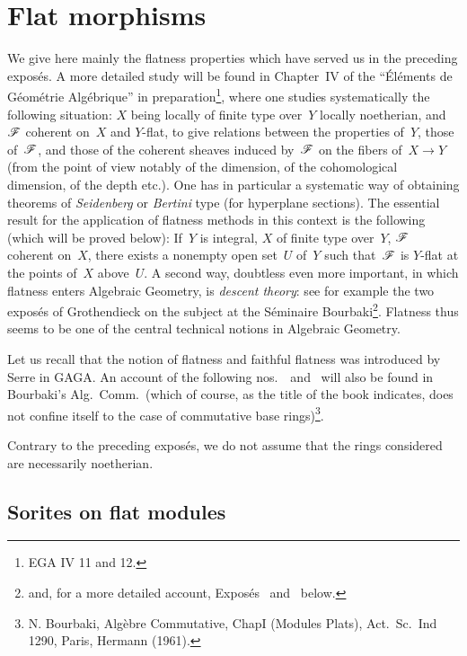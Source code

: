 \chapter{Flat morphisms}\label{IV}
We give here mainly the flatness properties which have served us in
the preceding expos\'es. A more detailed study will be found in
Chapter~IV of the ``\'El\'ements de G\'eom\'etrie Alg\'ebrique'' in
preparation\footnote{\Cf EGA IV 11 and 12.}, where one studies
systematically the following situation: $X$ being locally of finite
type over~$Y$ locally noetherian, and~$\cal{F}$ coherent on~$X$ and
$Y$-flat, to give relations between the properties of~$Y$, those
of~$\cal{F}$, and those of the coherent sheaves induced by~$\cal{F}$
on the fibers of~$X\to Y$ (from the point of view notably of the
dimension, of the cohomological dimension, of the depth etc.). One
has in particular a systematic way of obtaining theorems of
\emph{Seidenberg} or \emph{Bertini} type (for hyperplane sections).
The essential result for the application of flatness methods in this
context is the following (which will be proved below): If~$Y$ is
integral, $X$ of finite type over~$Y$, $\cal{F}$ coherent on~$X$,
there exists a nonempty open set~$U$ of~$Y$ such that~$\cal{F}$ is
$Y$-flat at the points of~$X$ above~$U$. A second way, doubtless even
more important, in which flatness enters Algebraic Geometry, is
\emph{descent theory}: see for example the two expos\'es of
Grothendieck on the subject at the S\'eminaire
Bourbaki\footnote{and, for a more detailed account,
Expos\'es~ and~ below.}. Flatness thus seems to be
one of the central technical notions in Algebraic Geometry.

Let us recall that the notion of flatness and faithful flatness was
introduced by Serre in GAGA. An account of the following
nos.~~and~ will also be found in Bourbaki's
Alg.\ Comm.\ (which of course, as the title of the book indicates,
does not confine itself to the case of commutative base
rings)\footnote{N. Bourbaki, Alg\`ebre Commutative, Chap\ptbl I
(Modules Plats), Act.\ Sc.\ Ind 1290, Paris, Hermann (1961).}.

Contrary to the preceding expos\'es, we do not assume that the rings
considered are necessarily noetherian.

\section{Sorites on flat modules}
\label{IV.1}

